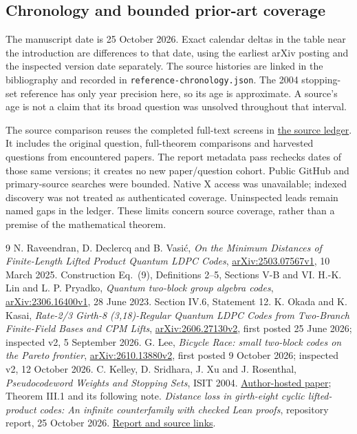 \documentclass[11pt]{article}
\theoremstyle{definition}\newtheorem{definition}[theorem]{Definition}
\begin{document}
\subsection{Chronology and bounded prior-art coverage}\label{app:sources}
The manuscript date is 25 October 2026. Exact calendar deltas in the table
near the introduction are differences to that date, using the earliest
arXiv posting and the inspected version date separately. The source histories
are linked in the bibliography and recorded in
\texttt{reference-chronology.json}. The 2004 stopping-set reference has only
year precision here, so its age is approximate. A source's age is not a
claim that its broad question was unsolved throughout that interval.

The source comparison reuses the completed full-text screens in
\href{https://github.com/alectionary/vibe-math/blob/3ae21c0719cedbd928f4f7882f9b9e266567605e/literature/truncated-distance12-source-screening.json}{the source ledger}.
It includes the original question, full-theorem comparisons and harvested
questions from encountered papers. The report metadata pass rechecks dates
of those same versions; it creates no new paper/question cohort.
Public GitHub and primary-source searches were bounded. Native X access was
unavailable; indexed discovery was not treated as authenticated coverage.
Uninspected leads remain named gaps in the ledger. These limits concern
source coverage, rather than a premise of the mathematical theorem.

\begin{thebibliography}{9}
 N. Raveendran, D. Declercq and B. Vasi\'c,
\emph{On the Minimum Distances of Finite-Length Lifted Product Quantum LDPC Codes},
\href{https://arxiv.org/abs/2503.07567v1}{arXiv:2503.07567v1}, 10 March 2025.
Construction Eq.~(9), Definitions 2--5, Sections V-B and VI.
 H.-K. Lin and L. P. Pryadko,
\emph{Quantum two-block group algebra codes},
\href{https://arxiv.org/abs/2306.16400v1}{arXiv:2306.16400v1}, 28 June 2023.
Section IV.6, Statement 12.
 K. Okada and K. Kasai,
\emph{Rate-2/3 Girth-8 (3,18)-Regular Quantum LDPC Codes from Two-Branch
Finite-Field Bases and CPM Lifts},
\href{https://arxiv.org/abs/2606.27130v2}{arXiv:2606.27130v2},
first posted 25 June 2026; inspected v2, 5 September 2026.
 G. Lee,
\emph{Bicycle Race: small two-block codes on the Pareto frontier},
\href{https://arxiv.org/abs/2610.13880v2}{arXiv:2610.13880v2},
first posted 9 October 2026; inspected v2, 12 October 2026.
 C. Kelley, D. Sridhara, J. Xu and J. Rosenthal,
\emph{Pseudocodeword Weights and Stopping Sets}, ISIT 2004.
\href{https://user.math.uzh.ch/kelley/isit2004_Chicago.pdf}{Author-hosted paper};
Theorem III.1 and its following note.
 \emph{Distance loss in girth-eight cyclic lifted-product
codes: An infinite counterfamily with checked Lean proofs}, repository report,
25 October 2026.
\href{https://github.com/alectionary/vibe-math/blob/3ae21c0719cedbd928f4f7882f9b9e266567605e/formalization/distance-preservation/paper/main.pdf}{Report and source links}.
\end{thebibliography}



\end{document}
